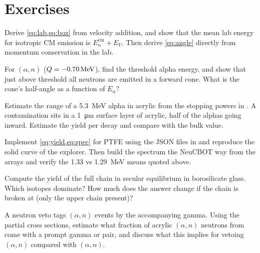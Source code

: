 \section{Exercises}
\begin{exercise}[A]
Derive \cref{eq:lab,eq:box} from velocity addition, and show that the mean lab energy for isotropic CM emission is $E_n^\text{cm} + E_V$. Then derive \cref{eq:angle} directly from momentum conservation in the lab.
\end{exercise}
\begin{exercise}[A]
For $(\alpha,n)$ ($Q = -0.70\,\mathrm{MeV}$), find the threshold alpha energy, and show that just above threshold all neutrons are emitted in a forward cone. What is the cone's half-angle as a function of $E_\alpha$?
\end{exercise}
\begin{exercise}[A]
Estimate the range of a \SI{5.3}{MeV} alpha in acrylic from the stopping powers in . A  contamination sits in a \SI{1}{\micro m} surface layer of acrylic, half of the alphas going inward. Estimate the yield per decay and compare with the bulk value.
\end{exercise}
\begin{exercise}[P]
Implement \cref{eq:yield,eq:spec} for PTFE using the JSON files in  and reproduce the solid curve of the explorer. Then build the spectrum the NeuCBOT way from the  arrays and verify the 1.33 vs \SI{1.29}{MeV} means quoted above.
\end{exercise}
\begin{exercise}[P]
Compute the yield of the full  chain in secular equilibrium in borosilicate glass. Which isotopes dominate? How much does the answer change if the chain is broken at  (only the upper chain present)?
\end{exercise}
\begin{exercise}[R]
A neutron veto tags $(\alpha,n)$ events by the accompanying gamma. Using the partial cross sections, estimate what fraction of acrylic $(\alpha,n)$ neutrons from  come with a prompt gamma or pair, and discuss what this implies for vetoing $(\alpha,n)$ compared with $(\alpha,n)$.
\end{exercise}

